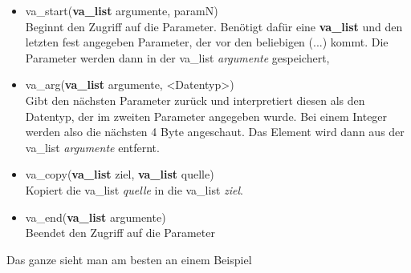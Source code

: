 \documentclass[c_worksheet.tex]{subfiles}
\begin{document}
\begin{itemize}
	\item va\_start(\textbf{va\_list} argumente, paramN) \\
	Beginnt den Zugriff auf die Parameter. Benötigt dafür eine \textbf{va\_list} und den letzten fest angegeben Parameter, der vor den beliebigen (...) kommt. Die Parameter werden dann in der va\_list \emph{argumente} gespeichert,
	\item va\_arg(\textbf{va\_list} argumente, <Datentyp>) \\
	Gibt den nächsten Parameter zurück und interpretiert diesen als den Datentyp, der im zweiten Parameter angegeben wurde. Bei einem Integer werden also die nächsten 4 Byte angeschaut. Das Element wird dann aus der va\_list \emph{argumente} entfernt.
	\item va\_copy(\textbf{va\_list} ziel, \textbf{va\_list} quelle) \\
	Kopiert die va\_list \emph{quelle} in die va\_list \emph{ziel}.
	\item va\_end(\textbf{va\_list} argumente) \\
	Beendet den Zugriff auf die Parameter
\end{itemize}

Das ganze sieht man am besten an einem Beispiel


\end{document}
